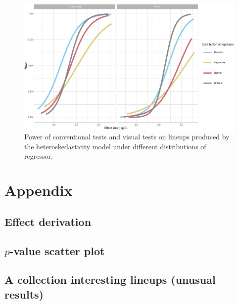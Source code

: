 \documentclass[]{interact}
\theoremstyle{plain}%
\theoremstyle{definition}
\theoremstyle{remark}
\begin{document}
\begin{figure}

{\centering \includegraphics[width=1\linewidth]{paper_comparison_files/figure-latex/different-x-dist-heter-power-1} 

}

\caption{Power of conventional tests and visual tests on lineups produced by the heteroskedasticity model under different distributions of regressor.}\label{fig:different-x-dist-heter-power}
\end{figure}

\hypertarget{appendix}{%
\section{Appendix}\label{appendix}}

\hypertarget{effect-derivation}{%
\subsection{Effect derivation}\label{effect-derivation}}

\hypertarget{p-value-scatter-plot}{%
\subsection{\texorpdfstring{\(p\)-value scatter
plot}{p-value scatter plot}}\label{p-value-scatter-plot}}

\hypertarget{a-collection-interesting-lineups-unusual-results}{%
\subsection{A collection interesting lineups (unusual
results)}\label{a-collection-interesting-lineups-unusual-results}}
\end{document}
